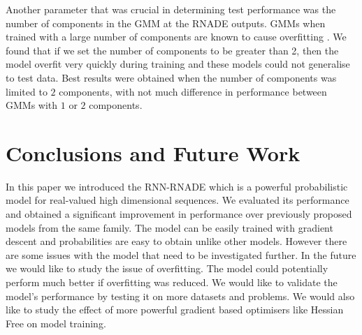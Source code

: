 \documentclass{article} %
\begin{document}
Another parameter that was crucial in determining test performance was the number of components in the GMM at the RNADE outputs. GMMs when trained with a large number of components are known to cause overfitting \cite{bishop2006pattern}. We found that if we set the number of components to be greater than 2, then the model overfit very quickly during training and these models could not generalise to test data. Best results were obtained when the number of components was limited to $2$ components, with not much difference in performance between GMMs with $1$ or $2$ components.  

\section{Conclusions and Future Work}

In this paper we introduced the RNN-RNADE which is a powerful probabilistic model for real-valued high dimensional sequences. We evaluated its performance and obtained a significant improvement in performance over previously proposed models from the same family. The model can be easily trained with gradient descent and probabilities are easy to obtain unlike other models. However there are some issues with the model that need to be investigated further. In the future we would like to study the issue of overfitting. The model could potentially perform much better if overfitting was reduced. We would like to validate the model's performance by testing it on more datasets and problems. We would also like to study the effect of more powerful gradient based optimisers like Hessian Free on model training. 

\label{conclusion}



\end{document}
